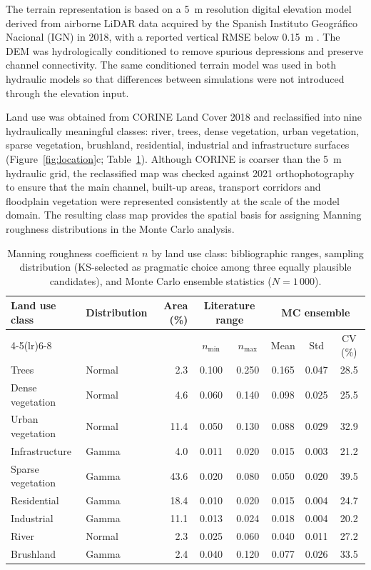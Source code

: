\documentclass[a4paper,fleqn]{cas-sc}
\newcommand{\nman}{$n$}
\begin{document}
The terrain representation is based on a 5~m resolution digital elevation model derived from airborne LiDAR data acquired by the Spanish Instituto Geográfico Nacional (IGN) in 2018, with a reported vertical RMSE below 0.15~m \citep{ign2018pnoa}. The DEM was hydrologically conditioned to remove spurious depressions and preserve channel connectivity. The same conditioned terrain model was used in both hydraulic models so that differences between simulations were not introduced through the elevation input.

Land use was obtained from CORINE Land Cover 2018 and reclassified into nine hydraulically meaningful classes: river, trees, dense vegetation, urban vegetation, sparse vegetation, brushland, residential, industrial and infrastructure surfaces \citep{copernicus2018clc} (Figure~\ref{fig:location}c; Table~\ref{tab:manning}). Although CORINE is coarser than the 5~m hydraulic
grid, the reclassified map was checked against 2021 orthophotography \citep{ign2021pnoa} to ensure that the main channel, built-up areas, transport corridors and floodplain vegetation were represented consistently at the scale of the model domain. The resulting class map provides the spatial basis for assigning Manning
roughness distributions in the Monte Carlo analysis.

\begin{table}[htbp]
\centering
\caption{Manning roughness coefficient \nman{} by land use class:
bibliographic ranges, sampling distribution (KS-selected as pragmatic choice among three equally plausible candidates), and
Monte Carlo ensemble statistics ($N = 1\,000$).}
\label{tab:manning}
\small
\begin{tabular}{llrccccc}
\toprule
\multirow{2}{*}{Land use class} &
\multirow{2}{*}{Distribution} &
\multirow{2}{*}{Area (\%)} &
\multicolumn{2}{c}{Literature range} &
\multicolumn{3}{c}{MC ensemble} \\
\cmidrule(lr){4-5}\cmidrule(lr){6-8}
& & & $n_{\min}$ & $n_{\max}$ & Mean & Std & CV (\%) \\
\midrule
Trees             & Normal     &  2.3 & 0.100 & 0.250 & 0.165 & 0.047 & 28.5 \\
Dense vegetation  & Normal     &  4.6 & 0.060 & 0.140 & 0.098 & 0.025 & 25.5 \\
Urban vegetation  & Normal     & 11.4 & 0.050 & 0.130 & 0.088 & 0.029 & 32.9 \\
Infrastructure    & Gamma      &  4.0 & 0.011 & 0.020 & 0.015 & 0.003 & 21.2 \\
Sparse vegetation & Gamma      & 43.6 & 0.020 & 0.080 & 0.050 & 0.020 & 39.5 \\
Residential       & Gamma      & 18.4 & 0.010 & 0.020 & 0.015 & 0.004 & 24.7 \\
Industrial        & Gamma      & 11.1 & 0.013 & 0.024 & 0.018 & 0.004 & 20.2 \\
River             & Normal     &  2.3 & 0.025 & 0.060 & 0.040 & 0.011 & 27.2 \\
Brushland         & Gamma      &  2.4 & 0.040 & 0.120 & 0.077 & 0.026 & 33.5 \\
\bottomrule
\end{tabular}
\end{table}
\end{document}
